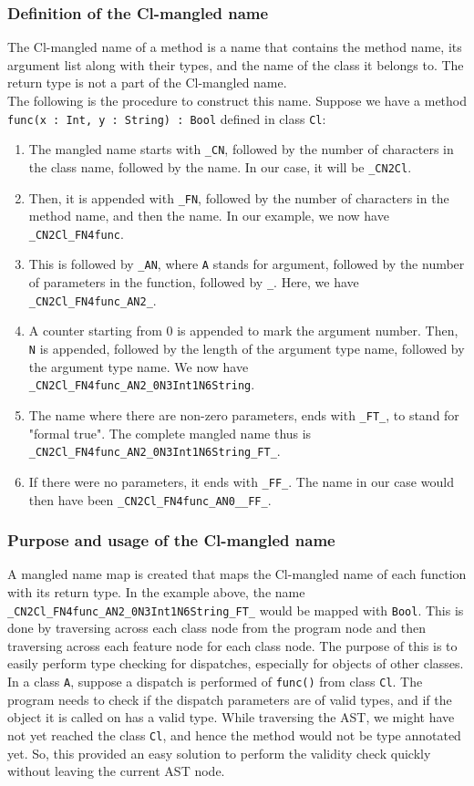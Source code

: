 \documentclass{article}
\begin{document}
\subsubsection*{Definition of the Cl-mangled name}
The Cl-mangled name of a method is a name that contains the method name, its argument list along with their types, and the name of the class it belongs to. The return type is not a part of the Cl-mangled name.\\
The following is the procedure to construct this name. Suppose we have a method \\ \verb|func(x : Int, y : String) : Bool| defined in class \verb|Cl|:
\begin{enumerate}
	\item The mangled name starts with \verb|_CN|, followed by the number of characters in the class name, followed by the name. In our case, it will be \verb|_CN2Cl|.
	\item Then, it is appended with \verb|_FN|, followed by the number of characters in the method name, and then the name. In our example, we now have \verb|_CN2Cl_FN4func|.
	\item This is followed by \verb|_AN|, where \verb|A| stands for argument, followed by the number of parameters in the function, followed by \verb|_|. Here, we have \verb|_CN2Cl_FN4func_AN2_|.
	\item A counter starting from $0$ is appended to mark the argument number. Then, \verb|N| is appended, followed by the length of the argument type name, followed by the argument type name. We now have \verb|_CN2Cl_FN4func_AN2_0N3Int1N6String|.
	\item The name where there are non-zero parameters, ends with \verb|_FT_|, to stand for "formal true". The complete mangled name thus is \verb|_CN2Cl_FN4func_AN2_0N3Int1N6String_FT_|.
	\item If there were no parameters, it ends with \verb|_FF_|. The name in our case would then have been \verb|_CN2Cl_FN4func_AN0__FF_|.
\end{enumerate}
	
\subsubsection*{Purpose and usage of the Cl-mangled name}
A mangled name map is created that maps the Cl-mangled name of each function with its return type. In the example above, the name  \verb|_CN2Cl_FN4func_AN2_0N3Int1N6String_FT_| would be mapped with \verb|Bool|. This is done by traversing across each class node from the program node and then traversing across each feature node for each class node. The purpose of this is to easily perform type checking for dispatches, especially for objects of other classes. In a class \verb|A|, suppose a dispatch is performed of \verb|func()| from class \verb|Cl|. The program needs to check if the dispatch parameters are of valid types, and if the object it is called on has a valid type. While traversing the AST, we might have not yet reached the class \verb|Cl|, and hence the method would not be type annotated yet. So, this provided an easy solution to perform the validity check quickly without leaving the current AST node.
\end{document}
